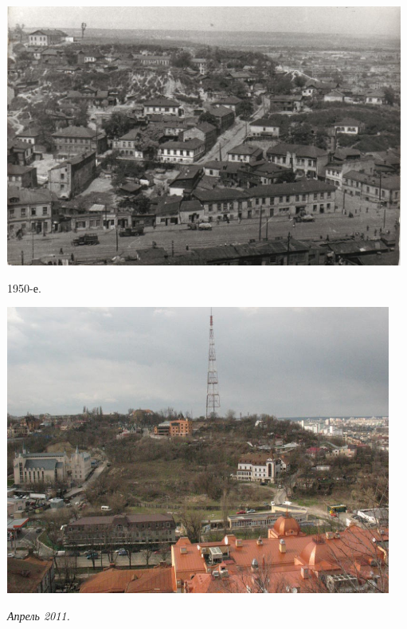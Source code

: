 \begin{center}
\includegraphics[width=0.98\textwidth]{chast-colebanie-osnov/sheka/sheka50.jpg}

1950-е.
\end{center}

\vspace*{\fill}
\begin{center}
\includegraphics[width=0.95\textwidth]{chast-colebanie-osnov/sheka/sheka-now.jpg}

\textit{Апрель 2011.}
\end{center}

\vspace*{\fill}




